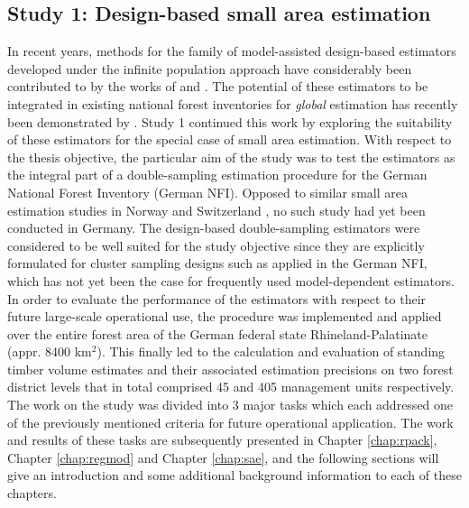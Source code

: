 \subsection{Study 1: Design-based small area estimation}
\label{sec:study1}


In recent years, methods for the family of model-assisted design-based estimators developed under the infinite population approach have considerably been contributed to by the works of \citet{mandallaz1991, mandallaz2008, mandallaz2013a, mandallaz2013c} and \citet{mandallaz2013b}. The potential of these estimators to be integrated in existing national forest inventories for \textit{global} estimation has recently been demonstrated by \citet{massey2015_thesis}. Study 1 continued this work by exploring the suitability of these estimators for the special case of small area estimation. With respect to the thesis objective, the particular aim of the study was to test the estimators as the integral part of a double-sampling estimation procedure for the German National Forest Inventory (German NFI). Opposed to similar small area estimation studies in Norway \citep{breidenbach2012} and Switzerland \citep{magnussen2014a, steinmann2013}, no such study had yet been conducted in Germany. The design-based double-sampling estimators were considered to be well suited for the study objective since they are explicitly formulated for cluster sampling designs such as applied in the German NFI, which has not yet been the case for frequently used model-dependent estimators. In order to evaluate the performance of the estimators with respect to their future large-scale operational use, the procedure was implemented and applied over the entire forest area of the German federal state Rhineland-Palatinate (appr. 8400 km$^2$). This finally led to the calculation and evaluation of standing timber volume estimates and their associated estimation precisions on two forest district levels that in total comprised 45 and 405 management units respectively. The work on the study was divided into 3 major tasks which each addressed one of the previously mentioned criteria for future operational application. The work and results of these tasks are subsequently presented in Chapter \ref{chap:rpack}, Chapter \ref{chap:regmod} and Chapter \ref{chap:sae}, and the following sections will give an introduction and some additional background information to each of these chapters.



